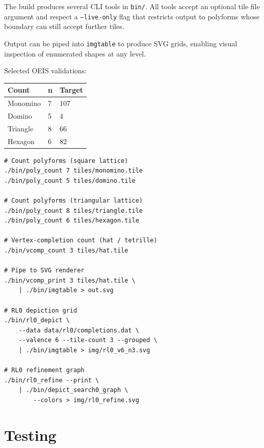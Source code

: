 \documentclass[10pt,a4paper]{article}
\newcommand{\code}[1]{\texttt{\small #1}}
\newcommand{\file}[1]{\texttt{\footnotesize #1}}
\begin{document}
\begin{tcolorbox}[dualbox, title=Usage Examples]
  The build produces several CLI tools in \file{bin/}.  All tools
  accept an optional tile file argument and respect a \code{--live-only}
  flag that restricts output to polyforms whose boundary can still
  accept further tiles.

  Output can be piped into \code{imgtable} to produce SVG grids,
  enabling visual inspection of enumerated shapes at any level.

  Selected OEIS validations:
  \vspace{4pt}
  \begin{tabular}{@{}lll@{}}
  \toprule
  \textbf{Count} & \textbf{n} & \textbf{Target} \\
  \midrule
  Monomino & 7 & 107 \\
  Domino   & 5 & 4 \\
  Triangle & 8 & 66 \\
  Hexagon  & 6 & 82 \\
  \bottomrule
  \end{tabular}
\tcblower
\begin{verbatim}
# Count polyforms (square lattice)
./bin/poly_count 7 tiles/monomino.tile
./bin/poly_count 5 tiles/domino.tile

# Count polyforms (triangular lattice)
./bin/poly_count 8 tiles/triangle.tile
./bin/poly_count 6 tiles/hexagon.tile

# Vertex-completion count (hat / tetrille)
./bin/vcomp_count 3 tiles/hat.tile

# Pipe to SVG renderer
./bin/vcomp_print 3 tiles/hat.tile \
    | ./bin/imgtable > out.svg

# RL0 depiction grid
./bin/rl0_depict \
    --data data/rl0/completions.dat \
    --valence 6 --tile-count 3 --grouped \
    | ./bin/imgtable > img/rl0_v6_n3.svg

# RL0 refinement graph
./bin/rl0_refine --print \
    | ./bin/depict_search0_graph \
        --colors > img/rl0_refine.svg
\end{verbatim}
\end{tcolorbox}

\section{Testing}
\end{document}
